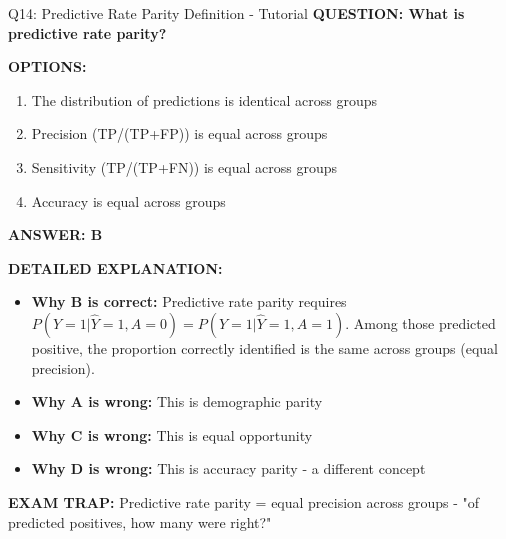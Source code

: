 \documentclass[8pt]{beamer}
\begin{document}
	\begin{frame}{Q14: Predictive Rate Parity Definition - Tutorial}
		\fontsize{6.5}{7.5}\selectfont
		\textbf{QUESTION: What is predictive rate parity?}
		
		\vspace{0.1cm}
		\textbf{OPTIONS:}
		\begin{enumerate}
			\item The distribution of predictions is identical across groups
			\item Precision (TP/(TP+FP)) is equal across groups
			\item Sensitivity (TP/(TP+FN)) is equal across groups
			\item Accuracy is equal across groups
		\end{enumerate}
		
		\vspace{0.1cm}
		\textcolor{myblue}{\textbf{ANSWER: B}}
		
		\vspace{0.1cm}
		\textbf{DETAILED EXPLANATION:}
		\begin{itemize}
			\item \textbf{Why B is correct:} Predictive rate parity requires $P(Y=1|\hat{Y}=1,A=0) = P(Y=1|\hat{Y}=1,A=1)$. Among those predicted positive, the proportion correctly identified is the same across groups (equal precision).
			\item \textbf{Why A is wrong:} This is demographic parity
			\item \textbf{Why C is wrong:} This is equal opportunity
			\item \textbf{Why D is wrong:} This is accuracy parity - a different concept
		\end{itemize}
		
		\textcolor{myred}{\textbf{EXAM TRAP:}} Predictive rate parity = \textcolor{myblue}{equal precision across groups} - "of predicted positives, how many were right?"
	\end{frame}
	
\end{document}
